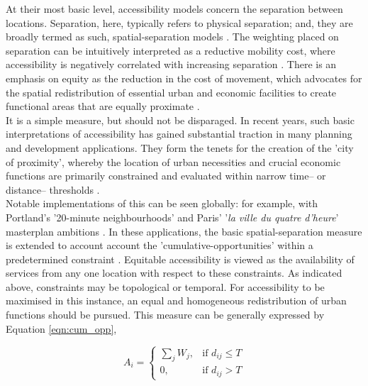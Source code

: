 At their most basic level, accessibility models concern the separation between locations. Separation, here, typically refers to physical separation; and, they are broadly termed as such, spatial-separation models \citep{bhat2000development}. The weighting placed on separation can be intuitively interpreted as a reductive mobility cost, where accessibility is negatively correlated with increasing separation \citep{miller2018accessibility}.  There is an emphasis on equity as the reduction in the cost of movement, which advocates for the spatial redistribution of essential urban and economic facilities to create functional areas that are equally proximate \citep{ingram1971concept, bhat2000development}. \\

It is a simple measure, but should not be disparaged. In recent years, such basic interpretations of accessibility has gained substantial traction in many planning and development applications. They form the tenets for the creation of the 'city of proximity', whereby the location of urban necessities and crucial economic functions are primarily constrained and evaluated within narrow time-- or distance-- thresholds \citep{bhat2000development, miller2018accessibility}. \\

Notable implementations of this can be seen globally: for example, with Portland's '20-minute neighbourhoods' and Paris' '\textit{la ville du quatre d'heure}' masterplan ambitions \citep{weber2002bringing,mcneil2011bikeability,handy2020accessibility}. In these applications, the basic spatial-separation measure is extended to account account the 'cumulative-opportunities' within a predetermined constraint \citep{bhat2000development}. Equitable accessibility is viewed as the availability of services from any one location with respect to these constraints. As indicated above, constraints may be topological or temporal. For accessibility to be maximised in this instance, an equal and homogeneous redistribution of urban functions should be pursued. This measure can be generally expressed by Equation \ref{eqn:cum_opp},

\begin{equation}
A_{i}= \begin{cases}
\sum_{j}W_{j}, & \text{if } d_{ij} \leq T \\ 0, & \text{if } d_{ij} > T 
\end{cases}
\label{eqn:cum_opp}
\end{equation}

